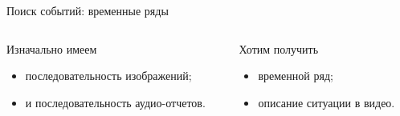 \begin{frame}{Поиск событий: временные ряды}

\begin{columns}[t]
    \begin{column}{0.5\textwidth}
        \begin{blue-box}{Изначально имеем}
            \begin{scriptsize}
                \begin{itemize}
                    \item последовательность изображений;
                    \item и последовательность аудио-отчетов.
                \end{itemize}
            \end{scriptsize}
        \end{blue-box}
    \end{column}
    \begin{column}{0.5\textwidth}
        \begin{orange-box}{Хотим получить}
            \begin{scriptsize}
                \begin{itemize}
                   \item временной ряд;
                   \item описание ситуации в видео.
                \end{itemize}
            \end{scriptsize}
        \end{orange-box}
    \end{column}
\end{columns}
  

\end{frame}
